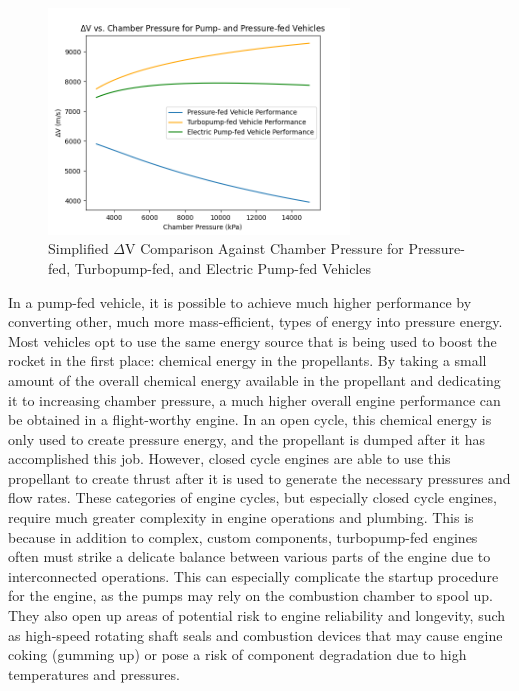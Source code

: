 \documentclass[12pt, letterpaper]{article}
\begin{document}
\begin{figure}[t]
    \centering
    \includegraphics[width=8cm]{Plots and Graphs/deltaV_Pressure_V_Pump.png}
    \caption{Simplified $\Delta$V Comparison Against Chamber Pressure for Pressure-fed, Turbopump-fed, and Electric Pump-fed Vehicles}
\end{figure}

In a pump-fed vehicle, it is possible to achieve much higher performance by converting other, much more mass-efficient, types of energy into pressure energy. Most vehicles opt to use the same energy source that is being used to boost the rocket in the first place: chemical energy in the propellants. By taking a small amount of the overall chemical energy available in the propellant and dedicating it to increasing chamber pressure, a much higher overall engine performance can be obtained in a flight-worthy engine. In an open cycle, this chemical energy is only used to create pressure energy, and the propellant is dumped after it has accomplished this job. However, closed cycle engines are able to use this propellant to create thrust after it is used to generate the necessary pressures and flow rates. These categories of engine cycles, but especially closed cycle engines, require much greater complexity in engine operations and plumbing. This is because in addition to complex, custom components, turbopump-fed engines often must strike a delicate balance between various parts of the engine due to interconnected operations. This can especially complicate the startup procedure for the engine, as the pumps may rely on the combustion chamber to spool up. They also open up areas of potential risk to engine reliability and longevity, such as high-speed rotating shaft seals and combustion devices that may cause engine coking (gumming up) or pose a risk of component degradation due to high temperatures and pressures.
\end{document}
